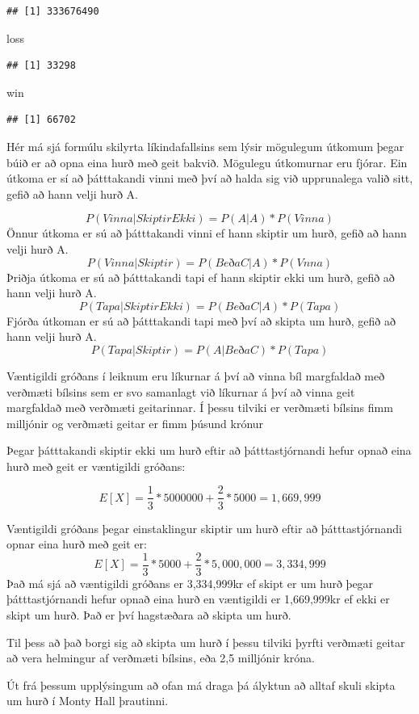 \documentclass[
]{article}
\newenvironment{Shaded}{\begin{snugshade}}{\end{snugshade}}
\newcommand{\NormalTok}[1]{#1}
\begin{document}
\begin{verbatim}
## [1] 333676490
\end{verbatim}

\begin{Shaded}
\begin{Highlighting}[]
\NormalTok{loss}
\end{Highlighting}
\end{Shaded}

\begin{verbatim}
## [1] 33298
\end{verbatim}

\begin{Shaded}
\begin{Highlighting}[]
\NormalTok{win}
\end{Highlighting}
\end{Shaded}

\begin{verbatim}
## [1] 66702
\end{verbatim}

Hér má sjá formúlu skilyrta líkindafallsins sem lýsir mögulegum útkomum
þegar búið er að opna eina hurð með geit bakvið. Mögulegu útkomurnar eru
fjórar. Ein útkoma er sí að þátttakandi vinni með því að halda sig við
upprunalega valið sitt, gefið að hann velji hurð A.

\[
P (Vinna | Skiptir Ekki) = P(A | A) * P(Vinna)
\] Önnur útkoma er sú að þátttakandi vinni ef hann skiptir um hurð,
gefið að hann velji hurð A. \[ 
P (Vinna | Skiptir ) = P(B eða C | A) * P(Vnna)
\] Þriðja útkoma er sú að þátttakandi tapi ef hann skiptir ekki um hurð,
gefið að hann velji hurð A. \[
P (Tapa | Skiptir Ekki ) = P(B eða C | A) * P(Tapa)
\] Fjórða útkoman er sú að þátttakandi tapi með því að skipta um hurð,
gefið að hann velji hurð A. \[
P(Tapa | Skiptir ) = P(A | B eða C ) * P (Tapa)
\]

Væntigildi gróðans í leiknum eru líkurnar á því að vinna bíl margfaldað
með verðmæti bílsins sem er svo samanlagt við líkurnar á því að vinna
geit margfaldað með verðmæti geitarinnar. Í þessu tilviki er verðmæti
bílsins fimm milljónir og verðmæti geitar er fimm þúsund krónur

Þegar þátttakandi skiptir ekki um hurð eftir að þátttastjórnandi hefur
opnað eina hurð með geit er væntigildi gróðans:

\[
E[X] = \frac{1}{3} * 5000000 + \frac{2}{3} * 5000
     = 1,669,999
\]

Væntigildi gróðans þegar einstaklingur skiptir um hurð eftir að
þátttastjórnandi opnar eina hurð með geit er: \[
E[X] = \frac{1}{3} * 5000 + \frac{2}{3} * 5,000,000
     = 3,334,999
\] Það má sjá að væntigildi gróðans er 3,334,999kr ef skipt er um hurð
þegar þátttastjórnandi hefur opnað eina hurð en væntigildi er
1,669,999kr ef ekki er skipt um hurð. Það er því hagstæðara að skipta um
hurð.

Til þess að það borgi sig að skipta um hurð í þessu tilviki þyrfti
verðmæti geitar að vera helmingur af verðmæti bílsins, eða 2,5 milljónir
króna.

Út frá þessum upplýsingum að ofan má draga þá ályktun að alltaf skuli
skipta um hurð í Monty Hall þrautinni.
\end{document}
